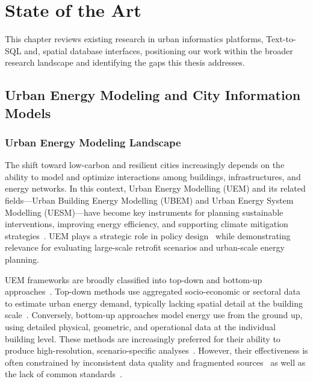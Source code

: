\chapter{State of the Art}
\label{ch:sota}

This chapter reviews existing research in urban informatics platforms, Text-to-SQL and, spatial database interfaces, positioning our work within the broader research landscape and identifying the gaps this thesis addresses.

\section{Urban Energy Modeling and City Information Models}

\subsection{Urban Energy Modeling Landscape}

The shift toward low-carbon and resilient cities increasingly depends on the ability to model and optimize interactions among buildings, infrastructures, and energy networks. In this context, Urban Energy Modelling (UEM) and its related fields---Urban Building Energy Modelling (UBEM) and Urban Energy System Modelling (UESM)---have become key instruments for planning sustainable interventions, improving energy efficiency, and supporting climate mitigation strategies~\cite{swan2009modeling, abbasabadi2019urban, hijazi2017integration, reinhart2016urban}. UEM plays a strategic role in policy design~\cite{keirstead2012review} while demonstrating relevance for evaluating large-scale retrofit scenarios and urban-scale energy planning.

UEM frameworks are broadly classified into top-down and bottom-up approaches~\cite{abbasabadi2019urban}. Top-down methods use aggregated socio-economic or sectoral data to estimate urban energy demand, typically lacking spatial detail at the building scale~\cite{swan2009modeling}. Conversely, bottom-up approaches model energy use from the ground up, using detailed physical, geometric, and operational data at the individual building level. These methods are increasingly preferred for their ability to produce high-resolution, scenario-specific analyses~\cite{keirstead2012review}. However, their effectiveness is often constrained by inconsistent data quality and fragmented sources~\cite{li2025integrating} as well as the lack of common standards~\cite{hong2020ten}.

